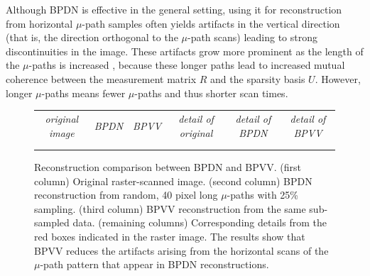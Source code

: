 \documentclass[twocolumn,oneside]{IEEEtran/IEEEtran}
\begin{document}
Although BPDN is effective in the general setting, using it for
reconstruction from horizontal $\mu$-path samples often yields
artifacts in the vertical direction (that is, the direction orthogonal
to the $\mu$-path scans) leading to strong discontinuities in the
image. These artifacts grow more prominent as the length of the
$\mu$-paths is increased \cite{maxwell2014compressed}, because these
longer paths lead to increased mutual coherence between the
measurement matrix $R$ and the sparsity basis $U$. However, longer
$\mu$-paths means fewer $\mu$-paths and thus shorter scan times.
\noindent
\begingroup \setlength{\tabcolsep}{1pt}
\begin{figure}[ht!]
  \centering
  \begin{tabular}{cccccc}
    \textit{\small original image} & \textit{\small BPDN} & \textit{\small BPVV}
    & \textit{\small detail of original} & \textit{\small detail of BPDN} & \textit{\small detail of BPVV} \\
    
                                   & 
                                                          & 
    & 
                                         & 
                                                                          & \\
    
                                   & 
                                                          & 
    & 
                                         & 
                                                                          & 
  \end{tabular}
  \caption{Reconstruction comparison between BPDN and BPVV. (first
    column) Original raster-scanned image. (second column) BPDN
    reconstruction from random, 40 pixel long $\mu$-paths with 25\%
    sampling. (third column) BPVV reconstruction from the same
    sub-sampled data. (remaining columns) Corresponding details from
    the red boxes indicated in the raster image. The results show that
    BPVV reduces the artifacts arising from the horizontal scans of
    the $\mu$-path pattern that appear in BPDN reconstructions.}
  \label{fig:BPTV_demonstration}
\end{figure}
\endgroup
\end{document}
